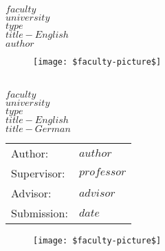 \documentclass[a4paper]{article}
\begin{document}
\thispagestyle{empty}
\begin{center}
	\bigskip \bigskip \bigskip 
	\oTUM{4.0cm} \\
	\vspace*{1cm}
	{ \bf $faculty$} \\
	{ \bf $university$} \\
	\bigskip \bigskip \bigskip \bigskip \bigskip
	{ $type$} \\
	\bigskip \bigskip \bigskip \bigskip \bigskip
	\bigskip \bigskip \bigskip \bigskip \bigskip
	{\Large \bf $title-English$} \\        
	\bigskip \bigskip \bigskip \bigskip
	{\Large $author$} \\    
	\bigskip\bigskip \bigskip \bigskip
	\begin{figure}[ht]
	\centering \texttt{[image: \$faculty-picture\$]}
	\end{figure}
	\bigskip 
\end{center}

\vfill

\newpage
\thispagestyle{empty}
\begin{center}
	\bigskip \bigskip \bigskip 
	\oTUM{4.0cm} \\
	\vspace*{1cm}
	{ \bf $faculty$} \\
	{ \bf $university$} \\
	\bigskip \bigskip \bigskip
	{$type$} \\
	\bigskip \bigskip \bigskip
	{\Large \bf $title-English$} \\        
	\bigskip \bigskip \bigskip
	{\Large \bf $title-German$} \\
	\bigskip \bigskip \bigskip
\end{center}

\begin{table}
\centering
\begin{tabular}{ll}
{Author:} & {$author$} \\
{Supervisor:} & {$professor$} \\
{Advisor:} & {$advisor$} \\
{Submission:} & {$date$} \\
\end{tabular}
\end{table}

\begin{figure}[ht]
	\centering \texttt{[image: \$faculty-picture\$]}
\end{figure}
\end{document}
